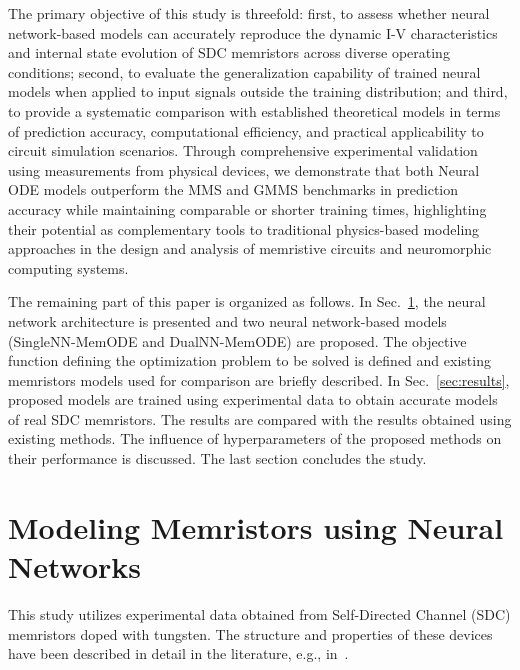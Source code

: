 \documentclass{ieeeaccess}
\begin{document}
The primary objective of this study is threefold: first, to assess whether neural network-based models can accurately reproduce the dynamic I-V characteristics and internal state evolution of SDC memristors across diverse operating conditions; second, to evaluate the generalization capability of trained neural models when applied to input signals outside the training distribution; and third, to provide a systematic comparison with established theoretical models in terms of prediction accuracy, computational efficiency, and practical applicability to circuit simulation scenarios. Through comprehensive experimental validation using measurements from physical devices, we demonstrate that both Neural ODE models outperform the MMS and GMMS benchmarks in prediction accuracy while maintaining comparable or shorter training times, highlighting their potential as complementary tools to traditional physics-based modeling approaches in the design and analysis of memristive circuits and neuromorphic computing systems.

The remaining part of this paper is organized as follows. In Sec.~\ref{sec:NNModeling}, the neural network architecture is presented and two neural network-based models (SingleNN-MemODE and DualNN-MemODE) are proposed. The objective function defining the optimization problem to be solved is defined and existing memristors models used for comparison are briefly described. In Sec.~\ref{sec:results}, proposed models are trained using experimental data to obtain accurate models of real SDC memristors. The results are compared with the results obtained using existing methods. The influence of hyperparameters of the proposed methods on their performance is discussed. The last section concludes the study.

\section{Modeling Memristors using Neural Networks}
\label{sec:NNModeling}

This study utilizes experimental data obtained from Self-Directed Channel (SDC) memristors doped with tungsten. The structure and properties of these devices have been described in detail in the literature, e.g., in~\cite{Campbell2017,Garda2024}.
\end{document}
